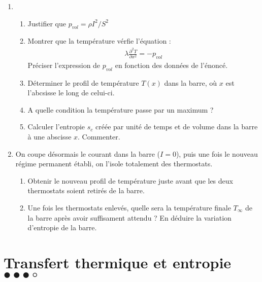 \begin{enumerate}

\item

\begin{enumerate}

	\item Justifier que  $p_{vol}=\rho I^2/S^2$

	\item Montrer que la température vérfie l'équation : 
		\begin{align*}
	  \lambda\frac{\partial^2 T}{\partial x^2} = - p_{vol}
	\end{align*}	
	Préciser l'expression de $p_{vol}$ en fonction des données de l'énoncé.

	\item Déterminer le profil de température $T(x)$ dans la barre, où $x$ est l'abcsisse le long de celui-ci.
	
	\item A quelle condition la température passe par un maximum ? 
	
	\item Calculer l'entropie $s_c$ créée par unité de temps et de volume dans la barre à une abscisse $x$. Commenter.
	
\end{enumerate}

\item On coupe désormais le courant dans la barre ($I=0$), puis une fois le nouveau régime permanent établi, on l'isole totalement des thermostats.

\begin{enumerate}
		
	\item Obtenir le nouveau profil de température juste avant que les deux thermostats soient retirés de la barre.
	
	\item Une fois les thermostats enlevés, quelle sera la température finale $T_\infty$ de la barre après avoir suffisament attendu ? En déduire la variation d'entropie de la barre.
	
\end{enumerate}

\end{enumerate}

\newpage

\section{Transfert thermique et entropie $\bullet\bullet\bullet\circ$}

